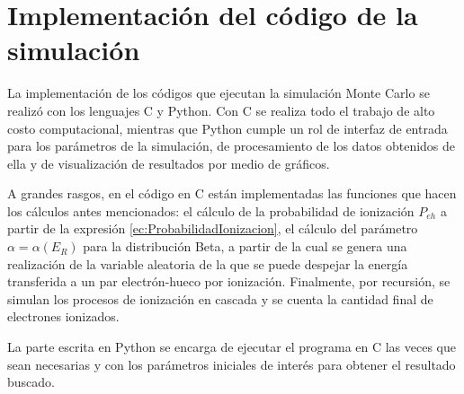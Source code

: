 \appendix
\chapter{Implementación del código de la simulación \label{app:Implementación}}
\noindent La implementación de los códigos que ejecutan la simulación Monte Carlo se realizó con los lenguajes C y Python. Con C se realiza todo el trabajo de alto costo computacional, mientras que Python cumple un rol de interfaz de entrada para los parámetros de la simulación, de procesamiento de los datos obtenidos de ella y de visualización de resultados por medio de gráficos.

A grandes rasgos, en el código en C están implementadas las funciones que hacen los cálculos antes mencionados: el cálculo de la probabilidad de ionización $P_{eh}$ a partir de la expresión \eqref{ec:ProbabilidadIonizacion}, el cálculo del parámetro $\alpha = \alpha(E_{R})$ para la distribución Beta, a partir de la cual se genera una realización de la variable aleatoria de la que se puede despejar la energía transferida a un par electrón-hueco por ionización. Finalmente, por recursión, se simulan los procesos de ionización en cascada y se cuenta la cantidad final de electrones ionizados.

La parte escrita en Python se encarga de ejecutar el programa en C las veces que sean necesarias y con los parámetros iniciales de interés para obtener el resultado buscado.

